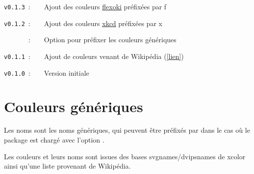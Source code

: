 \documentclass[french,11pt,a4paper]{article}
\begin{document}
\verb|v0.1.3|~:~~~~Ajout des couleurs \href{https://stephango.com/flexoki}{flexoki} préfixées par \textsf{f}

\verb|v0.1.2|~:~~~~Ajout des couleurs \href{https://xkcd.com/color/rgb.txt}{xkcd} préfixées par \textsf{x}

\verb|      |~:~~~~Option pour préfixer les couleurs génériques

\verb|v0.1.1|~:~~~~Ajout de couleurs venant de Wikipédia (\href{https://fr.wikipedia.org/wiki/Liste_de_noms_de_couleur}{[lien]})

\verb|v0.1.0|~:~~~~Version initiale

\vspace*{15mm}

\pagebreak

\section{Couleurs génériques}

Les noms sont les noms génériques, qui peuvent être préfixés par  dans le cas où le package est chargé avec l'option \MontreCode{[Prefixe]}.

\smallskip

Les couleurs et leurs noms sont issues des bases \textsf{svgnames/dvipsnames} de \textsf{xcolor} ainsi qu'une liste provenant de \textsf{Wikipédia}.
%
\end{document}

